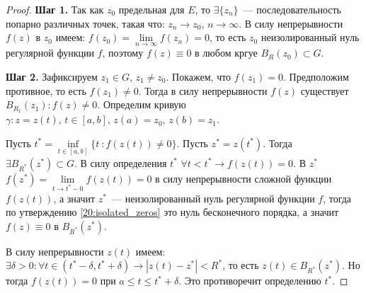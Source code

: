 \begin{proof}
    \textbf{Шаг 1.} Так как \(z_0\) предельная для \(E\), то \(\exists \{z_n\}\)~---
    последовательность попарно различных точек, такая что: \(z_n \rightarrow z_0, \, n \rightarrow
    \infty\). В силу непрерывности \(f(z)\) в \(z_0\) имеем: \(f(z_0) = \lim\limits_{n \rightarrow
    \infty} f(z_n) = 0\), то есть \(z_0\) неизолированный нуль регулярной функции \(f\), поэтому
    \(f(z) \equiv 0\) в любом кргуе \(B_R(z_0) \subset G\).

    \textbf{Шаг 2.} Зафиксируем \(z_1 \in G\), \(z_1 \ne z_0\). Покажем, что \(f(z_1) = 0\).
    Предположим противное, то есть \(f(z_1) \ne 0\). Тогда в силу непрерывности \(f(z)\) существует
    \(B_{R_1}(z_1) \colon f(z) \ne 0\). Определим кривую \(\gamma \colon z = z(t), \, t \in [a,b],
    \, z(a) = z_0, \, z(b) = z_1\).


    Пусть \(t^* = \inf\limits_{t \in [a,b]}\{t\ \colon f(z(t)) \ne 0\}\). Пусть \(z^* = z(t^*)\).
    Тогда \(\exists B_{R^*}(z^*) \subset G\). В силу определения \(t^*\) \(\forall t < t^*
    \rightarrow f(z(t)) = 0\). В \(z^*\) \(f(z^*) = \lim\limits_{t \rightarrow t^* - 0} f(z(t)) =0\)
    в силу непрерывности сложной функции \(f(z(t))\), а значит \(z^*\)~--- неизолированный нуль
    регулярной функции \(f\), тогда по утверждению \ref{20:isolated_zeros} это нуль бесконечного
    порядка, а значит \(f(z) \equiv 0\) в \(B_{R^*}(z^*)\).

    В силу непрерывности \(z(t)\) имеем: \(\exists \delta > 0\colon \forall t \in (t^*-\delta,
    t^*+\delta) \rightarrow |z(t) - z^*| < R^*\), то есть \(z(t) \in B_{R^*}(z^*)\). Но тогда
    \(f(z(t)) = 0\) при \(a \le t \le t^* + \delta\). Это противоречит определению \(t^*\).
\end{proof}

